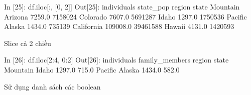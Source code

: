 \documentclass[
]{book}
\newenvironment{Shaded}{\begin{snugshade}}{\end{snugshade}}
\newcommand{\DecValTok}[1]{\textcolor[rgb]{0.00,0.00,0.81}{#1}}
\newcommand{\FloatTok}[1]{\textcolor[rgb]{0.00,0.00,0.81}{#1}}
\newcommand{\NormalTok}[1]{#1}
\begin{document}
\begin{Shaded}
\begin{Highlighting}[]
\NormalTok{In [}\DecValTok{25}\NormalTok{]: df.iloc[:, [}\DecValTok{0}\NormalTok{, }\DecValTok{2}\NormalTok{]]}
\NormalTok{Out[}\DecValTok{25}\NormalTok{]:}
\NormalTok{                     individuals  state\_pop}
\NormalTok{region   state                             }
\NormalTok{Mountain Arizona          }\FloatTok{7259.0}    \DecValTok{7158024}
\NormalTok{         Colorado         }\FloatTok{7607.0}    \DecValTok{5691287}
\NormalTok{         Idaho            }\FloatTok{1297.0}    \DecValTok{1750536}
\NormalTok{Pacific  Alaska           }\FloatTok{1434.0}     \DecValTok{735139}
\NormalTok{         California     }\FloatTok{109008.0}   \DecValTok{39461588}
\NormalTok{         Hawaii           }\FloatTok{4131.0}    \DecValTok{1420593}
\end{Highlighting}
\end{Shaded}

Slice cả 2 chiều

\begin{Shaded}
\begin{Highlighting}[]
\NormalTok{In [}\DecValTok{26}\NormalTok{]: df.iloc[}\DecValTok{2}\NormalTok{:}\DecValTok{4}\NormalTok{, }\DecValTok{0}\NormalTok{:}\DecValTok{2}\NormalTok{]}
\NormalTok{Out[}\DecValTok{26}\NormalTok{]:}
\NormalTok{                 individuals  family\_members}
\NormalTok{region   state                              }
\NormalTok{Mountain Idaho        }\FloatTok{1297.0}           \FloatTok{715.0}
\NormalTok{Pacific  Alaska       }\FloatTok{1434.0}           \FloatTok{582.0}
\end{Highlighting}
\end{Shaded}

Sử dụng danh sách các boolean
\end{document}
